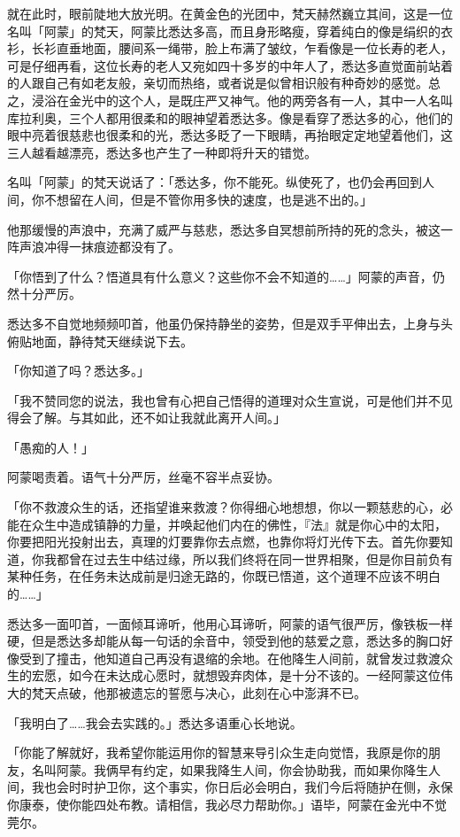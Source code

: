 \documentclass[twoside,openany]{book}
\begin{document}
就在此时，眼前陡地大放光明。在黄金色的光团中，梵天赫然巍立其间，这是一位名叫「阿蒙」的梵天，阿蒙比悉达多高，而且身形略瘦，穿着纯白的像是绢织的衣衫，长衫直垂地面，腰间系一绳带，脸上布满了皱纹，乍看像是一位长寿的老人，可是仔细再看，这位长寿的老人又宛如四十多岁的中年人了，悉达多直觉面前站着的人跟自己有如老友般，亲切而热络，或者说是似曾相识般有种奇妙的感觉。总之，浸浴在金光中的这个人，是既庄严又神气。他的两旁各有一人，其中一人名叫库拉利奥，三个人都用很柔和的眼神望着悉达多。像是看穿了悉达多的心，他们的眼中亮着很慈悲也很柔和的光，悉达多眨了一下眼睛，再抬眼定定地望着他们，这三人越看越漂亮，悉达多也产生了一种即将升天的错觉。

名叫「阿蒙」的梵天说话了：「悉达多，你不能死。纵使死了，也仍会再回到人间，你不想留在人间，但是不管你用多快的速度，也是逃不出的。」

他那缓慢的声浪中，充满了威严与慈悲，悉达多自冥想前所持的死的念头，被这一阵声浪冲得一抹痕迹都没有了。

「你悟到了什么？悟道具有什么意义？这些你不会不知道的……」阿蒙的声音，仍然十分严厉。

悉达多不自觉地频频叩首，他虽仍保持静坐的姿势，但是双手平伸出去，上身与头俯贴地面，静待梵天继续说下去。

「你知道了吗？悉达多。」

「我不赞同您的说法，我也曾有心把自己悟得的道理对众生宣说，可是他们并不见得会了解。与其如此，还不如让我就此离开人间。」

「愚痴的人！」

阿蒙喝责着。语气十分严厉，丝毫不容半点妥协。

「你不救渡众生的话，还指望谁来救渡？你得细心地想想，你以一颗慈悲的心，必能在众生中造成镇静的力量，并唤起他们内在的佛性，『法』就是你心中的太阳，你要把阳光投射出去，真理的灯要靠你去点燃，也靠你将灯光传下去。首先你要知道，你我都曾在过去生中结过缘，所以我们终将在同一世界相聚，但是你目前负有某种任务，在任务未达成前是归途无路的，你既已悟道，这个道理不应该不明白的……」

悉达多一面叩首，一面倾耳谛听，他用心耳谛听，阿蒙的语气很严厉，像铁板一样硬，但是悉达多却能从每一句话的余音中，领受到他的慈爱之意，悉达多的胸口好像受到了撞击，他知道自己再没有退缩的余地。在他降生人间前，就曾发过救渡众生的宏愿，如今在未达成心愿时，就想毁弃肉体，是十分不该的。一经阿蒙这位伟大的梵天点破，他那被遗忘的誓愿与决心，此刻在心中澎湃不已。

「我明白了……我会去实践的。」悉达多语重心长地说。

「你能了解就好，我希望你能运用你的智慧来导引众生走向觉悟，我原是你的朋友，名叫阿蒙。我俩早有约定，如果我降生人间，你会协助我，而如果你降生人间，我也会时时护卫你，这个事实，你日后必会明白，我们今后将随护在侧，永保你康泰，使你能四处布教。请相信，我必尽力帮助你。」语毕，阿蒙在金光中不觉莞尔。
\end{document}
